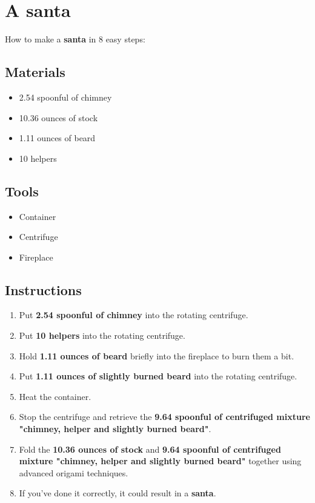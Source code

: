 \documentclass{article}
\begin{document}
\section{A santa}How to make a \textbf{santa} in 8 easy steps:

\subsection{Materials}\begin{itemize}
\item 
2.54 spoonful of chimney
\item 
10.36 ounces of stock
\item 
1.11 ounces of beard
\item 
10 helpers
\end{itemize}
\subsection{Tools}\begin{itemize}
\item 
Container
\item 
Centrifuge
\item 
Fireplace
\end{itemize}
\subsection{Instructions}\begin{enumerate}
\item 
Put \textbf{2.54 spoonful of chimney} into the rotating centrifuge.
\item 
Put \textbf{10 helpers} into the rotating centrifuge.
\item 
Hold \textbf{1.11 ounces of beard} briefly into the fireplace to burn them a bit.
\item 
Put \textbf{1.11 ounces of slightly burned beard} into the rotating centrifuge.
\item 
Heat the container.
\item 
Stop the centrifuge and retrieve the \textbf{9.64 spoonful of centrifuged mixture "chimney, helper and slightly burned beard"}.
\item 
Fold the \textbf{10.36 ounces of stock} and \textbf{9.64 spoonful of centrifuged mixture "chimney, helper and slightly burned beard"} together using advanced origami techniques.
\item 
If you've done it correctly, it could result in a \textbf{santa}.
\end{enumerate}
\newpage
\end{document}
